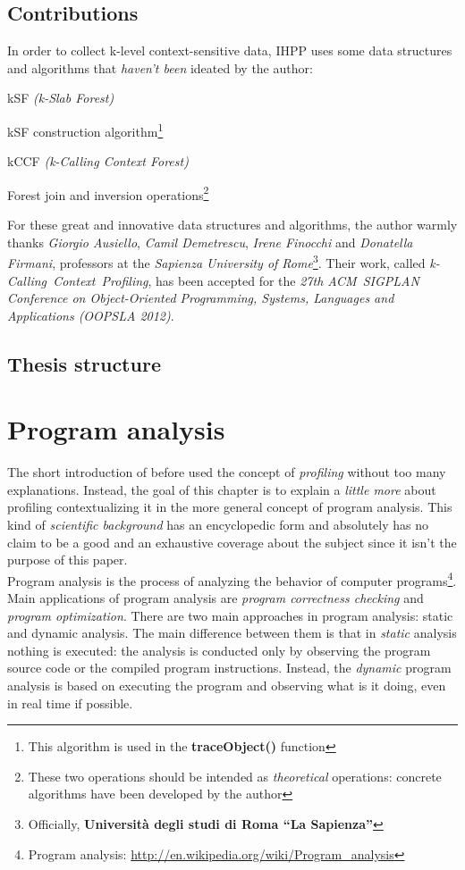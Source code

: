 \documentclass[a4paper,11pt]{report}
\begin{document}
\section{Contributions}

In order to collect k-level context-sensitive data, IHPP uses some data structures and algorithms that \emph{haven't been} ideated by the author:
\begin{itemize*}
\item kSF \emph{(k-Slab Forest)}
\item kSF construction algorithm\footnote{This algorithm is used in the \textbf{traceObject()} function}
\item kCCF \emph{(k-Calling Context Forest)}
\item Forest join and inversion operations\footnote{These two operations should be intended as \emph{theoretical} operations: concrete algorithms have been developed by the author}
\end{itemize*}

For these great and innovative data structures and algorithms, the author warmly thanks \emph{Giorgio Ausiello}, \emph{Camil Demetrescu}, \emph{Irene Finocchi} and \emph{Donatella Firmani}, professors at the \emph{Sapienza University of Rome}\footnote{Officially, \textbf{Universit\`a degli studi di Roma ``La Sapienza''}}. Their work, called \emph{\mbox{k-Calling Context Profiling}}, has been accepted for the \emph{27th \mbox{ACM SIGPLAN} Conference on Object-Oriented Programming, Systems, Languages and Applications (OOPSLA 2012)}.

\section{Thesis structure}

\chapter{Program analysis}
The short introduction of before used the concept of \emph{profiling} without too many explanations. 
Instead, the goal of this chapter is to explain a \emph{little more} about profiling contextualizing it in the more general concept of program analysis. This kind of \emph{scientific background} has an encyclopedic form and absolutely has no claim to be a good and an exhaustive coverage about the subject since it isn't the purpose of this paper.\\ 

Program analysis is the process of analyzing the behavior of computer programs\footnote{Program analysis: \url{http://en.wikipedia.org/wiki/Program_analysis}}. Main applications of program analysis are \emph{program correctness checking} and \emph{program optimization}.
There are two main approaches in program analysis: static and dynamic analysis.
The main difference between them is that in \emph{static} analysis nothing is executed: the analysis
is conducted only by observing the program source code or the compiled program instructions. Instead, the \emph{dynamic} program analysis is based on executing the program and observing what is it doing, even in real time if possible.
\end{document}
